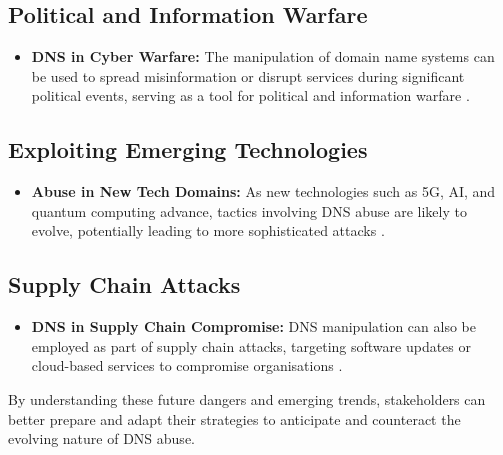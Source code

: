 \subsection{Political and Information Warfare}
\begin{itemize}
    \item \textbf{DNS in Cyber Warfare:} The manipulation of domain name systems can be used to spread misinformation or disrupt services during significant political events, serving as a tool for political and information warfare \cite{chapple2021cyberwarfare}.
\end{itemize}

\subsection{Exploiting Emerging Technologies}
\begin{itemize}
    \item \textbf{Abuse in New Tech Domains:} As new technologies such as 5G, AI, and quantum computing advance, tactics involving DNS abuse are likely to evolve, potentially leading to more sophisticated attacks \cite{brunner2021cybersecurity}.
\end{itemize}

\subsection{Supply Chain Attacks}
\begin{itemize}
    \item \textbf{DNS in Supply Chain Compromise:} DNS manipulation can also be employed as part of supply chain attacks, targeting software updates or cloud-based services to compromise organisations \cite{boyson2014cyber}.
\end{itemize}

By understanding these future dangers and emerging trends, stakeholders can better prepare and adapt their strategies to anticipate and counteract the evolving nature of DNS abuse.


